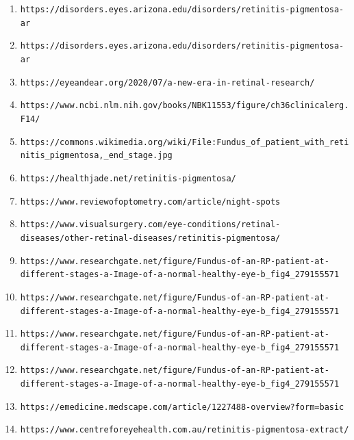 \documentclass{article}
\begin{document}
\begin{enumerate}
		\item \nolinkurl{https://disorders.eyes.arizona.edu/disorders/retinitis-pigmentosa-ar}
		
		\item \nolinkurl{https://disorders.eyes.arizona.edu/disorders/retinitis-pigmentosa-ar}
		
		\item \nolinkurl{https://eyeandear.org/2020/07/a-new-era-in-retinal-research/}
		
		\item \nolinkurl{https://www.ncbi.nlm.nih.gov/books/NBK11553/figure/ch36clinicalerg.F14/}
		
		\item \nolinkurl{https://commons.wikimedia.org/wiki/File:Fundus_of_patient_with_retinitis_pigmentosa,_end_stage.jpg}
		
		\item \nolinkurl{https://healthjade.net/retinitis-pigmentosa/}
		
		\item \nolinkurl{https://www.reviewofoptometry.com/article/night-spots}
		
		\item \nolinkurl{https://www.visualsurgery.com/eye-conditions/retinal-diseases/other-retinal-diseases/retinitis-pigmentosa/}
		
		\item \nolinkurl{https://www.researchgate.net/figure/Fundus-of-an-RP-patient-at-different-stages-a-Image-of-a-normal-healthy-eye-b_fig4_279155571}
		
		\item \nolinkurl{https://www.researchgate.net/figure/Fundus-of-an-RP-patient-at-different-stages-a-Image-of-a-normal-healthy-eye-b_fig4_279155571}
		
		\item \nolinkurl{https://www.researchgate.net/figure/Fundus-of-an-RP-patient-at-different-stages-a-Image-of-a-normal-healthy-eye-b_fig4_279155571}
		
		\item \nolinkurl{https://www.researchgate.net/figure/Fundus-of-an-RP-patient-at-different-stages-a-Image-of-a-normal-healthy-eye-b_fig4_279155571}
		
		\item \nolinkurl{https://emedicine.medscape.com/article/1227488-overview?form=basic}
		
		\item \nolinkurl{https://www.centreforeyehealth.com.au/retinitis-pigmentosa-extract/}
		

\end{enumerate}
\end{document}
